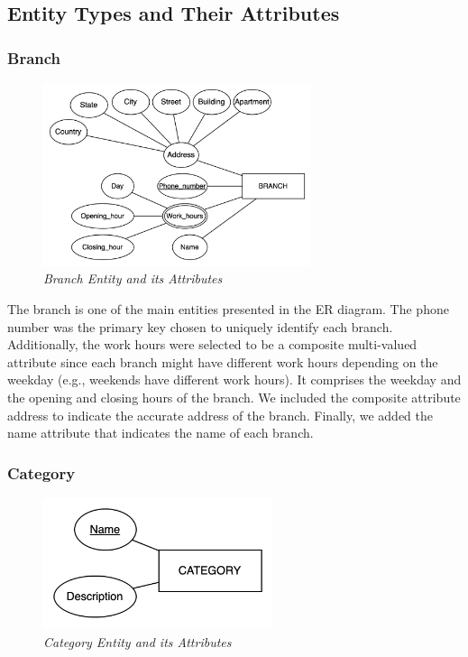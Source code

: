 \documentclass[11pt]{article}
\begin{document}
\subsection{Entity Types and Their Attributes}

\subsubsection{Branch}
\begin{figure}[H]
  \centering
  \includegraphics[width=0.7\textwidth]{images/entities/branch.png}
  \caption{\textit{Branch Entity and its Attributes}}
\end{figure}

The branch is one of the main entities presented in the ER diagram. The phone number was the primary key chosen to uniquely identify each branch. Additionally, the work hours were selected to be a composite multi-valued attribute since each branch might have different work hours depending on the weekday (e.g., weekends have different work hours). It comprises the weekday and the opening and closing hours of the branch. We included the composite attribute address to indicate the accurate address of the branch. Finally, we added the name attribute that indicates the name of each branch.

\subsubsection{Category}
\begin{figure}[H]
  \centering
  \includegraphics[width=0.6\textwidth]{images/entities/category.png}
  \caption{\textit{Category Entity and its Attributes}}
\end{figure}
\end{document}
